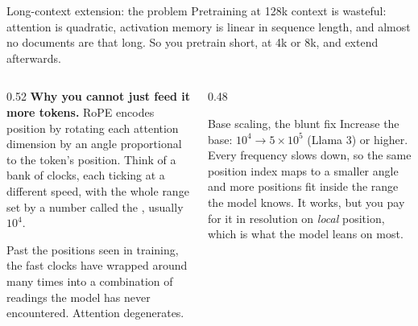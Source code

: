 \documentclass[aspectratio=169,10pt]{beamer}
\begin{document}
\begin{frame}[shrink=8]{Long-context extension: the problem}
  Pretraining at 128k context is wasteful: attention is quadratic, activation
  memory is linear in sequence length, and almost no documents are that long.
  So you pretrain short, at 4k or 8k, and extend afterwards.
  \vspace{0.6em}
  \begin{columns}[T]
    \begin{column}{0.52\textwidth}
      \textbf{Why you cannot just feed it more tokens.} RoPE encodes position by
      rotating each attention dimension by an angle proportional to the token's
      position. Think of a bank of clocks, each ticking at a different speed,
      with the whole range set by a number called the , usually
      $10^4$.
      \vspace{0.4em}

      Past the positions seen in training, the fast clocks have wrapped around
      many times into a combination of readings the model has never encountered.
      Attention degenerates.
    \end{column}
    \begin{column}{0.48\textwidth}
      \begin{block}{Base scaling, the blunt fix}
        \small
        Increase the base: $10^4 \to 5\times10^5$ (Llama 3) or higher. Every
        frequency slows down, so the same position index maps to a smaller
        angle and more positions fit inside the range the model knows.
        \vspace{0.4em}
        It works, but you pay for it in resolution on \emph{local} position,
        which is what the model leans on most.
      \end{block}
    \end{column}
  \end{columns}
\end{frame}
\end{document}
